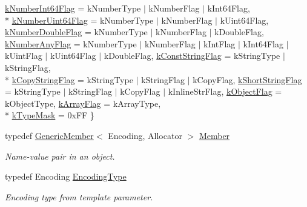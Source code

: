 \begin{DoxyCompactItemize}
\hyperlink{classGenericValue_aacdfd9d0f85a6161380a134e6d0c9d3cad117eb41bb8015a76aadf6149bbd8ce5}{k\+Number\+Int64\+Flag} = k\+Number\+Type $\vert$ k\+Number\+Flag $\vert$ k\+Int64\+Flag, 
\\*
\hyperlink{classGenericValue_aacdfd9d0f85a6161380a134e6d0c9d3caaa1ee6a546d4db67f4bdef41d1f54f02}{k\+Number\+Uint64\+Flag} = k\+Number\+Type $\vert$ k\+Number\+Flag $\vert$ k\+Uint64\+Flag, 
\hyperlink{classGenericValue_aacdfd9d0f85a6161380a134e6d0c9d3ca29bc91c155577923abd8f19aa050058b}{k\+Number\+Double\+Flag} = k\+Number\+Type $\vert$ k\+Number\+Flag $\vert$ k\+Double\+Flag, 
\hyperlink{classGenericValue_aacdfd9d0f85a6161380a134e6d0c9d3cab7805b1908fd181afc8d70fe07b17e18}{k\+Number\+Any\+Flag} = k\+Number\+Type $\vert$ k\+Number\+Flag $\vert$ k\+Int\+Flag $\vert$ k\+Int64\+Flag $\vert$ k\+Uint\+Flag $\vert$ k\+Uint64\+Flag $\vert$ k\+Double\+Flag, 
\hyperlink{classGenericValue_aacdfd9d0f85a6161380a134e6d0c9d3ca5d26a84f26833eafd0028c0102a388a9}{k\+Const\+String\+Flag} = k\+String\+Type $\vert$ k\+String\+Flag, 
\\*
\hyperlink{classGenericValue_aacdfd9d0f85a6161380a134e6d0c9d3ca10c83f7f191dce81bb0273adc0d838de}{k\+Copy\+String\+Flag} = k\+String\+Type $\vert$ k\+String\+Flag $\vert$ k\+Copy\+Flag, 
\hyperlink{classGenericValue_aacdfd9d0f85a6161380a134e6d0c9d3caca24fa09485fa10b17071509a985ff01}{k\+Short\+String\+Flag} = k\+String\+Type $\vert$ k\+String\+Flag $\vert$ k\+Copy\+Flag $\vert$ k\+Inline\+Str\+Flag, 
\hyperlink{classGenericValue_aacdfd9d0f85a6161380a134e6d0c9d3caba5811d4baeb56dc793a6510fe28748c}{k\+Object\+Flag} = k\+Object\+Type, 
\hyperlink{classGenericValue_aacdfd9d0f85a6161380a134e6d0c9d3caf7d99965ba807c718b482a9a7fb28b47}{k\+Array\+Flag} = k\+Array\+Type, 
\\*
\hyperlink{classGenericValue_aacdfd9d0f85a6161380a134e6d0c9d3ca793e0bc40e0abe1ed8bcb3e6fbba65c2}{k\+Type\+Mask} = 0x\+FF
 \}
\item 
typedef \hyperlink{structGenericMember}{Generic\+Member}$<$ Encoding, Allocator $>$ \hyperlink{classGenericValue_a7ccf27c44058b4c11c3efc6473afb886}{Member}
\begin{DoxyCompactList}\small\item\em Name-\/value pair in an object. \end{DoxyCompactList}\item 
typedef Encoding \hyperlink{classGenericValue_a28c2cb8d04d12566c1af37597a46d209}{Encoding\+Type}
\begin{DoxyCompactList}\small\item\em Encoding type from template parameter. \end{DoxyCompactList}\item 

\end{DoxyCompactItemize}
